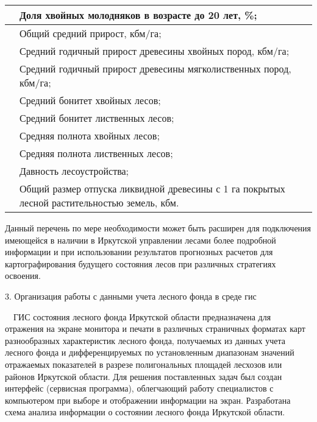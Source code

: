 \documentclass{report}
\begin{document}
\begin{flushleft}
\begin{supertabular}{|m{3.7419999cm}|m{13.077001cm}|}
 &
{ Доля хвойных молодняков в возрасте до 20 лет, \%;}\\\hline
{} &
{ Общий средний прирост, кбм/га;}\\\hline
{} &
{ Средний годичный прирост древесины хвойных пород, кбм/га;}\\\hline
{} &
{ Средний годичный прирост древесины мягколиственных пород, кбм/га;}\\\hline
{} &
{ Средний бонитет хвойных лесов;}\\\hline
{} &
{ Средний бонитет лиственных лесов;}\\\hline
{} &
{ Средняя полнота хвойных лесов;}\\\hline
{} &
{ Средняя полнота лиственных лесов;}\\\hline
{} &
{ Давность лесоустройства;}\\\hline
{} &
{ Общий размер отпуска ликвидной древесины с 1 га покрытых лесной растительностью земель,
кбм.}\\\hline
\end{supertabular}
\end{flushleft}
Данный перечень по мере необходимости может быть расширен для подключения имеющейся в наличии в Иркутской управлении
лесами более подробной информации и при использовании результатов прогнозных расчетов для картографирования будущего
состояния лесов при различных стратегиях освоения. 

3. Организация работы с данными учета лесного фонда в среде гис

\ \ ГИС состояния лесного фонда Иркутской области предназначена для отражения на экране монитора и печати в различных
страничных форматах карт разнообразных характеристик лесного фонда, получаемых из данных учета лесного фонда  и
дифференцируемых по установленным диапазонам значений отражаемых показателей в разрезе полигональных площадей лесхозов
или районов Иркутской области. Для решения поставленных задач был создан интерфейс (сервисная программа), облегчающий
работу специалистов с компьютером при выборе и отображении информации на экран. Разработана схема анализа информации о
состоянии лесного фонда Иркутской области.  
\end{document}
